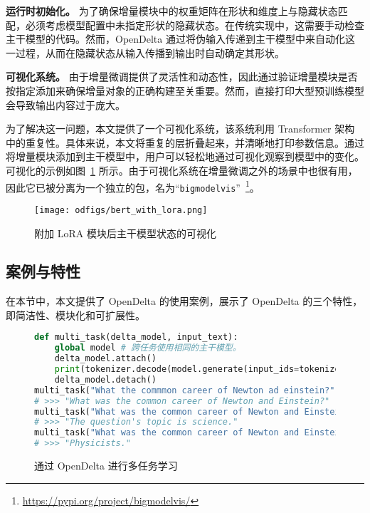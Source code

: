 \textbf{运行时初始化。} 为了确保增量模块中的权重矩阵在形状和维度上与隐藏状态匹配，必须考虑模型配置中未指定形状的隐藏状态。在传统实现中，这需要手动检查主干模型的代码。然而，OpenDelta 通过将伪输入传递到主干模型中来自动化这一过程，从而在隐藏状态从输入传播到输出时自动确定其形状。


\textbf{可视化系统。} 由于增量微调提供了灵活性和动态性，因此通过验证增量模块是否按指定添加来确保增量对象的正确构建至关重要。然而，直接打印大型预训练模型会导致输出内容过于庞大。

为了解决这一问题，本文提供了一个可视化系统，该系统利用 Transformer 架构中的重复性。具体来说，本文将重复的层折叠起来，并清晰地打印参数信息。通过将增量模块添加到主干模型中，用户可以轻松地通过可视化观察到模型中的变化。可视化的示例如图~\ref{fig:after_lora} 所示。由于可视化系统在增量微调之外的场景中也很有用，因此它已被分离为一个独立的包，名为“\texttt{bigmodelvis}”~\footnote{\url{https://pypi.org/project/bigmodelvis/}}。

\begin{figure}
    \centering
    \texttt{[image: odfigs/bert\_with\_lora.png]}
    \caption{附加 LoRA 模块后主干模型状态的可视化}
    \label{fig:after_lora}
\end{figure}

\subsection{案例与特性}
在本节中，本文提供了 OpenDelta 的使用案例，展示了 OpenDelta 的三个特性，即简洁性、模块化和可扩展性。

\begin{figure}[hbt!]
\centering
\begin{minipage}{0.94\textwidth}
\begin{lstlisting}[language=Python]
def multi_task(delta_model, input_text):
    global model # 跨任务使用相同的主干模型。
    delta_model.attach()
    print(tokenizer.decode(model.generate(input_ids=tokenize(input_text))))
    delta_model.detach()
multi_task("What the commmon career of Newton ad einstein?", spelling_delta)
# >>> "What was the common career of Newton and Einstein?"
multi_task("What was the common career of Newton and Einstein?", topic_delta)
# >>> "The question's topic is science."
multi_task("What was the common career of Newton and Einstein?", question_delta)
# >>> "Physicists."
\end{lstlisting}
\end{minipage} 
\caption{通过 OpenDelta 进行多任务学习}
\label{fig:code_multi_task} 
\end{figure}

